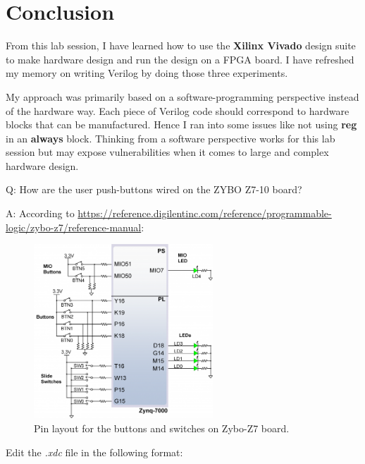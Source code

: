 \documentclass[11pt,letterpaper,titlepage]{article}
\begin{document}
\newpage

\part{Conclusion}

From this lab session, I have learned how to use the \textbf{Xilinx Vivado} design suite to make hardware design and run the design on a FPGA board. I have refreshed my memory on writing Verilog by doing those three experiments.

My approach was primarily based on a software-programming perspective instead of the hardware way. Each piece of Verilog code should correspond to hardware blocks that can be manufactured. Hence I ran into some issues like not using \textbf{reg} in an \textbf{always} block. Thinking from a software perspective works for this lab session but may expose vulnerabilities when it comes to large and complex hardware design. 

Q: How are the user push-buttons wired on the ZYBO Z7-10 board?

A: According to \href{https://reference.digilentinc.com/reference/programmable-logic/zybo-z7/reference-manual}{https://reference.digilentinc.com/reference/programmable-logic/zybo-z7/reference-manual}:


\begin{figure}[ht]
\centering
\includegraphics[width=0.6\textwidth]{zybo-z7-gpio.png}
\caption{Pin layout for the buttons and switches on Zybo-Z7 board.}
\end{figure}

Edit the \textit{.xdc} file in the following format:
\end{document}
